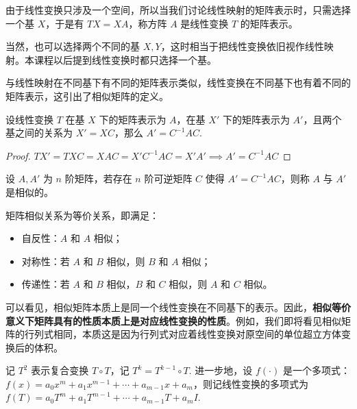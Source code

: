 \begin{definition}[线性变换的矩阵表示]
由于线性变换只涉及一个空间，所以当我们讨论线性映射的矩阵表示时，只需选择一个基 $X$，于是有 $TX=XA$，称方阵 $A$ 是线性变换 $T$ 的矩阵表示。
\end{definition}
\begin{com}
当然，也可以选择两个不同的基 $X,Y$，这时相当于把线性变换依旧视作线性映射。本课程以后提到线性变换时都只选择一个基。
\end{com}

与线性映射在不同基下有不同的矩阵表示类似，线性变换在不同基下也有着不同的矩阵表示，这引出了相似矩阵的定义。

\begin{theorem}[线性变换在不同基下的矩阵表示]
\label{thm:sim-trans}
设线性变换 $T$ 在基 $X$ 下的矩阵表示为 $A$，在基 $X'$ 下的矩阵表示为 $A'$，且两个基之间的关系为 $X'=XC$，那么 $A'=C^{-1}AC$.
\end{theorem}
\begin{proof}
$TX'=TXC=XAC=X'C^{-1}AC=X'A'\implies A'=C^{-1}AC$
\end{proof}

\begin{definition}[相似矩阵]
设 $A,A'$ 为 $n$ 阶矩阵，若存在 $n$ 阶可逆矩阵 $C$ 使得 $A'=C^{-1}AC$，则称 $A$ 与 $A'$ 是相似的。
\end{definition}

\begin{property}
矩阵相似关系为等价关系，即满足：
\begin{itemize}
    \item 自反性：$A$ 和 $A$ 相似；
    \item 对称性：若 $A$ 和 $B$ 相似，则 $B$ 和 $A$ 相似；
    \item 传递性：若 $A$ 和 $B$ 相似，$B$ 和 $C$ 相似，则 $A$ 和 $C$ 相似。
\end{itemize}
\end{property}

\begin{remark}
可以看见，相似矩阵本质上是同一个线性变换在不同基下的表示。因此，\textbf{相似等价意义下矩阵具有的性质本质上是对应线性变换的性质}。例如，我们即将看见相似矩阵的行列式相同，本质这是因为行列式对应着线性变换对原空间的单位超立方体变换后的体积。
\end{remark}

\begin{definition}[线性变换的多项式]
记 $T^2$ 表示复合变换 $T\circ T$，记 $T^k=T^{k-1}\circ T$. 进一步地，设 $f(\cdot)$ 是一个多项式：$f(x)=a_0x^m+a_1x^{m-1}+\cdots+a_{m-1}x+a_m$，则记线性变换的多项式为 $f(T)=a_0T^m+a_1T^{m-1}+\cdots+a_{m-1}T+a_mI$.
\end{definition}

